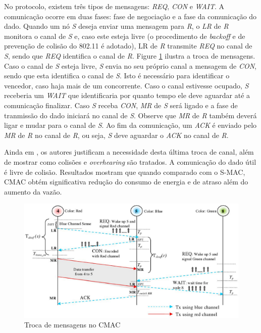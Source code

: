 \documentclass[12pt]{article}
\begin{document}
    No protocolo, existem três tipos de mensagens: \textit{REQ}, \textit{CON} e \textit{WAIT}. A comunicação ocorre em duas fases: fase de negociação e a fase da comunicação do dado. Quando um nó \emph{S} deseja enviar uma mensagem para \emph{R}, o \emph{LR} de \emph{R} monitora o canal de \emph{S} e, caso este esteja livre (o procedimento de \emph{backoff} e de prevenção de colisão do 802.11 é adotado), LR de \emph{R} transmite \emph{REQ} no canal de \emph{S}, sendo que \emph{REQ} identifica o canal de \emph{R}. Figure \ref{fig:cmac} ilustra a troca de mensagens. Caso o canal de \emph{S} esteja livre, \emph{S} envia no seu próprio canal a mensagem de \emph{CON}, sendo que esta identifica o canal de \emph{S}. Isto é necessário para identificar o vencedor, caso haja mais de um concorrente. Caso o canal estivesse ocupado, \emph{S} receberia um \emph{WAIT} que identificaria por quanto tempo ele deve aguardar até a comunicação finalizar. Caso \emph{S} receba \emph{CON}, \emph{MR} de \emph{S} será ligado e a fase de tranmissão do dado iniciará no canal de \emph{S}. Observe que \emph{MR} de \emph{R} também deverá ligar e mudar para o canal de \emph{S}. Ao fim da comunicação, um \emph{ACK} é enviado pelo \emph{MR} de \emph{R} no canal de \emph{R}, ou seja, \emph{S} deve aguardar o \emph{ACK} no canal de \emph{R}.

    Ainda em \cite{20084511683228}, os autores justificam a necessidade desta última troca de canal, além de mostrar como colisões e \textit{overhearing} são tratados. A comunicação do dado útil é livre de colisão. Resultados mostram que quando comparado com o S-MAC, CMAC obtém significativa redução do consumo de energia e de atraso além do aumento da vazão.


\begin{figure}
\centering
\includegraphics[scale=0.20]{imagens/cmac}
\caption{Troca de mensagens no CMAC \cite{20084511683228}}
\label{fig:cmac}
\end{figure}    
  
\end{document}
